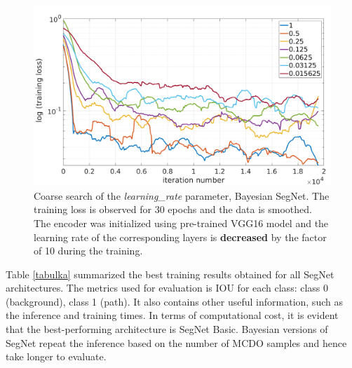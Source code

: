 \vspace{5mm}
\begin{figure}[h]
	\begin{center}
		\includegraphics*[width=14cm, keepaspectratio]{obr/bayes_full_rough_2.png}
	\end{center}
	\vspace{5mm}
	\caption{Coarse search of the \textit{learning\_rate} parameter, Bayesian SegNet. The training loss is observed for 30 epochs and the data is smoothed. The encoder was initialized using pre-trained VGG16 model and the learning rate of the corresponding layers is \textbf{decreased} by the factor of 10 during the training.} 
	\label{tuning2}
\end{figure}

Table \ref{tabulka} summarized the best training results obtained for all SegNet architectures. The metrics used for evaluation is IOU for each class: class 0 (background), class 1 (path). It also contains other useful information, such as the inference and training times. In terms of computational cost, it is evident that the best-performing architecture is SegNet Basic. Bayesian versions of SegNet repeat the inference based on the number of MCDO samples and hence take longer to evaluate. 

